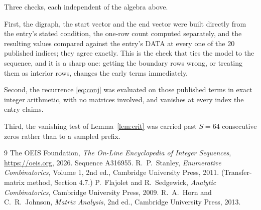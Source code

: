 \documentclass[11pt,a4paper]{article}
\theoremstyle{plain}
\theoremstyle{definition}
\begin{document}
Three checks, each independent of the algebra above.

First, the digraph, the start vector and the end vector were built directly from the
entry's stated condition, the one-row count computed separately, and the resulting values
compared against the entry's DATA at every one of the $20$ published indices; they
agree exactly. This is the check that ties the model to the sequence, and it is a sharp one:
getting the boundary rows wrong, or treating them as interior rows, changes the early terms
immediately.

Second, the recurrence \eqref{eq:conj} was evaluated on those published terms in exact
integer arithmetic, with no matrices involved, and vanishes at every index the entry claims.

Third, the vanishing test of Lemma~\ref{lem:crit} was carried past $S=64$ consecutive
zeros rather than to a sampled prefix.

\begin{thebibliography}{9}
 The OEIS Foundation, \emph{The On-Line Encyclopedia of Integer
Sequences}, \url{https://oeis.org}, 2026. Sequence A316955.
 R.~P.~Stanley, \emph{Enumerative Combinatorics}, Volume 1, 2nd ed.,
Cambridge University Press, 2011. (Transfer-matrix method, Section 4.7.)
 P.~Flajolet and R.~Sedgewick, \emph{Analytic Combinatorics}, Cambridge
University Press, 2009.
 R.~A.~Horn and C.~R.~Johnson, \emph{Matrix Analysis}, 2nd ed., Cambridge
University Press, 2013.
\end{thebibliography}
\end{document}
